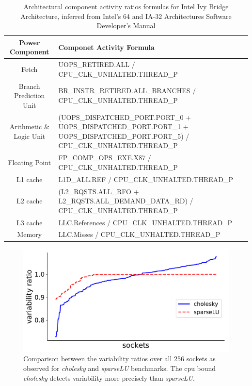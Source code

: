 \begin{table}
	\centering
	\caption{Architectural component activity ratios formulas for Intel Ivy Bridge Architecture, inferred from Intel's 64 and IA-32 Architectures Software Developer's Manual \cite{fquesnel:progguide:intel10}}
	\label{tab:comp_formulas}
	\def\arraystretch{1.5}%
	\begin{tabular}{ | c | m{11cm} | } 
		\hline
		\textbf{Power Component} & \textbf{Componet Activity Formula} \\ 
		\hline
		\hline
		Fetch & UOPS\_RETIRED.ALL / CPU\_CLK\_UNHALTED.THREAD\_P \\ 
		\hline
		Branch Prediction Unit & BR\_INSTR\_RETIRED.ALL\_BRANCHES / CPU\_CLK\_UNHALTED.THREAD\_P \\ 
		\hline
		Arithmetic \& Logic Unit & (UOPS\_DISPATCHED\_PORT.PORT\_0 + UOPS\_DISPATCHED\_PORT.PORT\_1 + UOPS\_DISPATCHED\_PORT.PORT\_5) / CPU\_CLK\_UNHALTED.THREAD\_P \\ 
		\hline
		Floating Point & FP\_COMP\_OPS\_EXE.X87 / CPU\_CLK\_UNHALTED.THREAD\_P \\ 
		\hline
		L1 cache & L1D\_ALL.REF / CPU\_CLK\_UNHALTED.THREAD\_P \\ 
		\hline 
		L2 cache & (L2\_RQSTS.ALL\_RFO + L2\_RQSTS.ALL\_DEMAND\_DATA\_RD) / CPU\_CLK\_UNHALTED.THREAD\_P \\ 
		\hline	
		L3 cache & LLC.References / CPU\_CLK\_UNHALTED.THREAD\_P \\ 
		\hline
		Memory & LLC.Misses / CPU\_CLK\_UNHALTED.THREAD\_P \\ 
		\hline
	\end{tabular}
	\vspace{.5cm}
\end{table}

\begin{figure}[ht!]
	\centering
  \includegraphics[width=.8\textwidth]{power_aware_job_scheduling/figures/benchmark_var_comparison}
	\caption{Comparison between the variability ratios over all 256 sockets as observed for \textit{cholesky} and \textit{sparseLU} benchmarks.  The cpu bound \textit{cholesky} detects variability more precisely than \textit{sparseLU}.}
	\label{fig:bench_var_comparison}
	\vspace{.5cm}
\end{figure}


